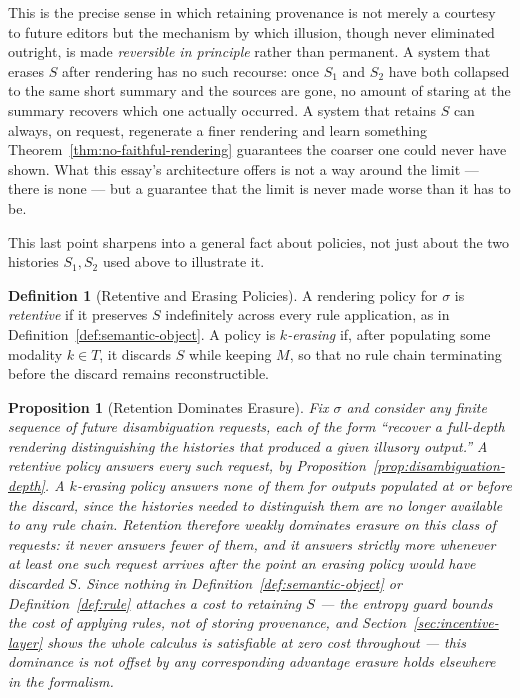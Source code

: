 \documentclass[11pt]{article}
\newtheorem{proposition}[theorem]{Proposition}
\theoremstyle{definition}
\newtheorem{definition}[theorem]{Definition}
\begin{document}
This is the precise sense in which retaining provenance is not merely a courtesy to future editors but the mechanism by which illusion, though never eliminated outright, is made \emph{reversible in principle} rather than permanent. A system that erases $S$ after rendering has no such recourse: once $S_1$ and $S_2$ have both collapsed to the same short summary and the sources are gone, no amount of staring at the summary recovers which one actually occurred. A system that retains $S$ can always, on request, regenerate a finer rendering and learn something Theorem~\ref{thm:no-faithful-rendering} guarantees the coarser one could never have shown. What this essay's architecture offers is not a way around the limit --- there is none --- but a guarantee that the limit is never made worse than it has to be.

This last point sharpens into a general fact about policies, not just about the two histories $S_1, S_2$ used above to illustrate it.

\begin{definition}[Retentive and Erasing Policies]
\label{def:policies}
A rendering policy for $\sigma$ is \emph{retentive} if it preserves $S$ indefinitely across every rule application, as in Definition~\ref{def:semantic-object}. A policy is \emph{$k$-erasing} if, after populating some modality $k \in T$, it discards $S$ while keeping $M$, so that no rule chain terminating before the discard remains reconstructible.
\end{definition}

\begin{proposition}[Retention Dominates Erasure]
\label{prop:dominance}
Fix $\sigma$ and consider any finite sequence of future disambiguation requests, each of the form ``recover a full-depth rendering distinguishing the histories that produced a given illusory output.'' A retentive policy answers every such request, by Proposition~\ref{prop:disambiguation-depth}. A $k$-erasing policy answers none of them for outputs populated at or before the discard, since the histories needed to distinguish them are no longer available to any rule chain. Retention therefore weakly dominates erasure on this class of requests: it never answers fewer of them, and it answers strictly more whenever at least one such request arrives after the point an erasing policy would have discarded $S$. Since nothing in Definition~\ref{def:semantic-object} or Definition~\ref{def:rule} attaches a cost to retaining $S$ --- the entropy guard bounds the cost of \emph{applying} rules, not of storing provenance, and Section~\ref{sec:incentive-layer} shows the whole calculus is satisfiable at zero cost throughout --- this dominance is not offset by any corresponding advantage erasure holds elsewhere in the formalism.
\end{proposition}
\end{document}
